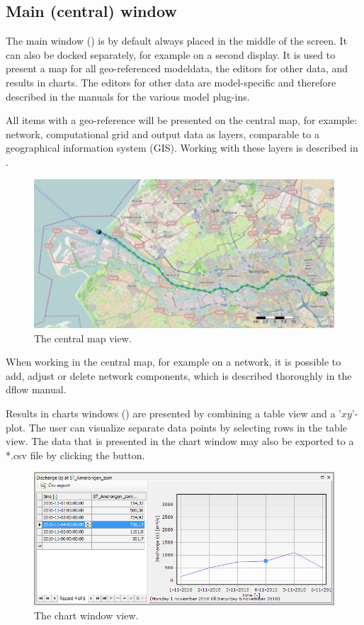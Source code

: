 \subsection{Main (central) window}
\label{subsec:Main}
The main window () is by default always placed in the middle of the screen. It can also be docked separately, for example on a second display. It is used to present a map for all geo-referenced modeldata, the editors for other data, and results in charts. The editors for other data are model-specific and therefore described in the manuals for the various model plug-ins.

All items with a geo-reference will be presented on the central map, for example: network, computational grid and output data as layers, comparable to a geographical information system (GIS). Working with these layers is described in .
%
\begin{figure} [H]
	\centering
		\includegraphics[width=\textwidth]{figures/chapter_overview/example_map.png}
	\caption{The central map view.}
	\label{fig:fig2.3}
\end{figure}
When working in the central map, for example on a network, it is possible to add, adjust or delete network components, which is described thoroughly in the dflow manual.

Results in charts windows () are presented by combining a table view and a '$xy$'-plot. The user can visualize separate data points by selecting rows in the table view. The data that is presented in the chart window may also be exported to a *.csv file by clicking the  button.
%
\begin{figure} [H]
	\centering
		\includegraphics[width=\textwidth]{figures/chapter_overview/example_chart_window.png}
	\caption{The chart window view.}
	\label{fig:chartwindow}
\end{figure}

